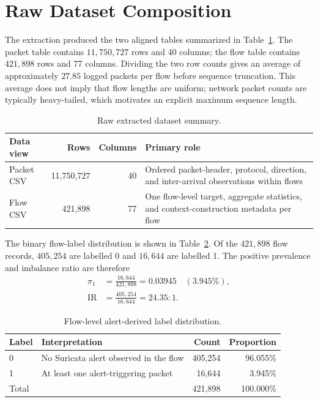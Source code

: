 \documentclass[11pt,fleqn]{report}
\begin{document}
\section{Raw Dataset Composition}
\label{subsec:raw_composition}

The extraction produced the two aligned tables summarized in
Table~\ref{tab:raw_dataset_summary}. The packet table contains
$11{,}750{,}727$ rows and 40 columns; the flow table contains $421{,}898$ rows
and 77 columns. Dividing the two row counts gives an average of approximately
$27.85$ logged packets per flow before sequence truncation. This average does
not imply that flow lengths are uniform; network packet counts are typically
heavy-tailed, which motivates an explicit maximum sequence length.

\begin{table}[H]
    \centering
    \caption{Raw extracted dataset summary.}
    \label{tab:raw_dataset_summary}
    \begin{tabular}{@{}lrrp{5.7cm}@{}}
        \toprule
        Data view & Rows & Columns & Primary role \\
        \midrule
        Packet CSV & 11,750,727 & 40 & Ordered packet-header, protocol,
        direction, and inter-arrival observations within flows \\
        Flow CSV & 421,898 & 77 & One flow-level target, aggregate
        statistics, and context-construction metadata per flow \\
        \bottomrule
    \end{tabular}
\end{table}

The binary flow-label distribution is shown in
Table~\ref{tab:flow_label_distribution}. Of the $421{,}898$ flow records,
$405{,}254$ are labelled 0 and $16{,}644$ are labelled 1. The positive
prevalence and imbalance ratio are therefore
\begin{align}
    \pi_1 &= \frac{16{,}644}{421{,}898} = 0.03945
             \quad (3.945\%), \\
    \mathrm{IR} &= \frac{405{,}254}{16{,}644} = 24.35:1.
    \label{eq:dataset_imbalance}
\end{align}

\begin{table}[H]
    \centering
    \caption{Flow-level alert-derived label distribution.}
    \label{tab:flow_label_distribution}
    \begin{tabular}{@{}llrr@{}}
        \toprule
        Label & Interpretation & Count & Proportion \\
        \midrule
        0 & No Suricata alert observed in the flow & 405,254 & 96.055\% \\
        1 & At least one alert-triggering packet & 16,644 & 3.945\% \\
        \midrule
        Total & & 421,898 & 100.000\% \\
        \bottomrule
    \end{tabular}
\end{table}
\end{document}
